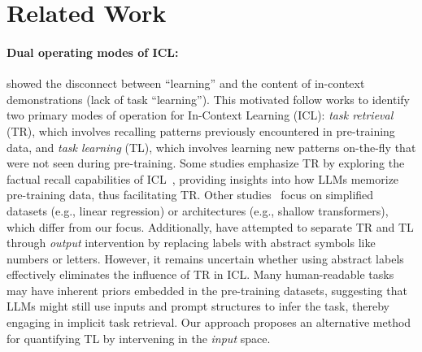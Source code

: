 \documentclass[11pt]{article}
\begin{document}



\section{Related Work}
\label{sec:related_work}

\paragraph{Dual operating modes of ICL:}
\citet{min2022rethinking} showed the disconnect between ``learning'' and the content of in-context demonstrations (lack of task ``learning''). This motivated follow works to identify two primary modes of operation for In-Context Learning (ICL): \emph{task retrieval} (TR), which involves recalling patterns previously encountered in pre-training data, and \emph{task learning} (TL), which involves learning new patterns on-the-fly that were not seen during pre-training. Some studies emphasize TR by exploring the factual recall capabilities of ICL~\citep{sun2022recitation, golchin2024memorization, han2023understanding,zhao2023context,reddy2023mechanistic,dankers2024generalisation}, providing insights into how LLMs memorize pre-training data, thus facilitating TR. Other studies~\cite{lin2024dual,song2024out,nafar2024learning,anand2024dual} focus on simplified datasets (e.g., linear regression) or architectures (e.g., shallow transformers), which differ from our focus. Additionally, \citet{pan2023incontext,wang2024investigating} have attempted to separate TR and TL through \emph{output} intervention by replacing labels with abstract symbols like numbers or letters. However, it remains uncertain whether using abstract labels effectively eliminates the influence of TR in ICL. Many human-readable tasks may have inherent priors embedded in the pre-training datasets, suggesting that LLMs might still use inputs and prompt structures to infer the task, thereby engaging in implicit task retrieval. Our approach proposes an alternative method for quantifying TL by intervening in the \emph{input} space.
\end{document}
